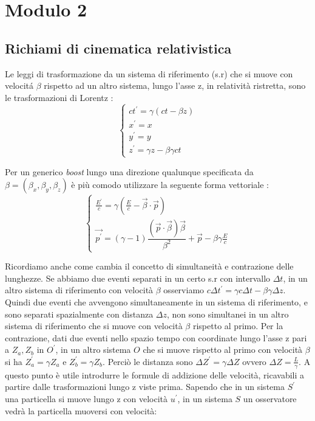 \chapter{Modulo 2}\label{cap : Mod2}

\section{Richiami di cinematica relativistica}

Le leggi di trasformazione da un sistema di riferimento (s.r) che si muove con velocit\'a $\beta$ rispetto ad un altro sistema, lungo l'asse z, in relatività ristretta, sono le trasformazioni di Lorentz : 
\[
\begin{cases}
ct^{'}=\gamma (ct - \beta z) \\
x^{'}= x \\
y^{'}= y \\
z^{'}= \gamma z - \beta \gamma c t
\end{cases} 
\]

Per un generico \textit{boost} lungo una direzione qualunque specificata da $\beta = (\beta_{x}, \beta_{y}, \beta_{z})$ è più comodo utilizzare la seguente forma vettoriale :
\[
\begin{cases}
\frac{E^{'}}{c} = \gamma (\frac{E}{c} - \vec{\beta} \cdot \vec{p}) \\
\vec{p^{'}} =(\gamma - 1) \dfrac{( \vec{p} \cdot\vec{\beta}) \vec{\beta}}{\beta^{2}}  + \vec{p} - \beta \gamma \frac{E}{c}
\end{cases}
\]

Ricordiamo anche come cambia il concetto di simultaneità e contrazione delle lunghezze. Se abbiamo due eventi separati in un certo 
s.r con intervallo $\Delta t$, in un altro sistema di riferimento con velocità $\beta$ osserviamo $c \Delta t^{'} = \gamma c \Delta t - \beta \gamma \Delta z$. Quindi due eventi che avvengono simultaneamente in un sistema di riferimento, e sono separati spazialmente con distanza $\Delta z$, non sono simultanei in un altro sistema di riferimento che si muove con velocità $\beta$ rispetto al primo. 
Per la contrazione, dati due eventi nello spazio tempo con coordinate lungo l'asse z pari a $Z_a , Z_b$ in $O^{'}$, in un altro sistema $O$ che si muove rispetto al primo con velocità $\beta$ si ha $Z_{a}^{'} = \gamma Z_a$ e $Z_b^{'} = \gamma Z_b$. Perciò le distanza sono $\Delta Z^{'} = \gamma \Delta Z$ ovvero $\Delta Z = \frac{L}{\gamma}$. A questo punto è utile introdurre le formule di addizione delle velocità, ricavabili a partire dalle trasformazioni lungo z viste prima. Sapendo che in un sistema $S^{'}$ una particella si muove lungo z con velocità $u^{'}$, in un sistema $S$ un osservatore vedrà la particella muoversi con velocità:

